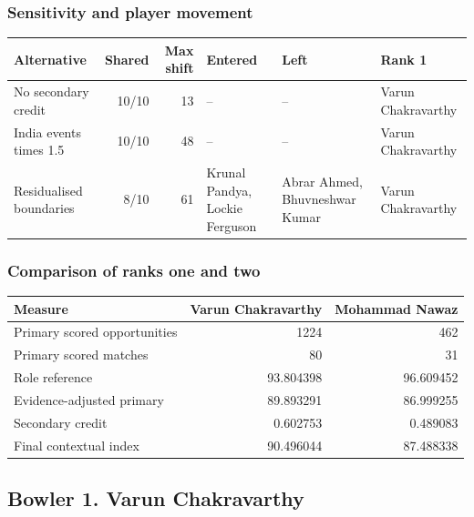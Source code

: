 \subsubsection*{Sensitivity and player movement}

\begin{center}
\begin{tabularx}{\linewidth}{>{\raggedright\arraybackslash}Xrr>{\raggedright\arraybackslash}X>{\raggedright\arraybackslash}X>{\raggedright\arraybackslash}X}
\toprule
Alternative & Shared & Max shift & Entered & Left & Rank 1 \\
\midrule
No secondary credit & 10/10 & 13 & -- & -- & Varun Chakravarthy \\
India events times 1.5 & 10/10 & 48 & -- & -- & Varun Chakravarthy \\
Residualised boundaries & 8/10 & 61 & Krunal Pandya, Lockie Ferguson & Abrar Ahmed, Bhuvneshwar Kumar & Varun Chakravarthy \\
\bottomrule
\end{tabularx}
\end{center}

\subsubsection*{Comparison of ranks one and two}

\begin{center}
\begin{tabularx}{\linewidth}{>{\raggedright\arraybackslash}Xrr}
\toprule
Measure & Varun Chakravarthy & Mohammad Nawaz \\
\midrule
Primary scored opportunities & 1224 & 462 \\
Primary scored matches & 80 & 31 \\
Role reference & 93.804398 & 96.609452 \\
Evidence-adjusted primary & 89.893291 & 86.999255 \\
Secondary credit & 0.602753 & 0.489083 \\
Final contextual index & 90.496044 & 87.488338 \\
\bottomrule
\end{tabularx}
\end{center}

\clearpage

\subsection{Bowler 1. Varun Chakravarthy}

